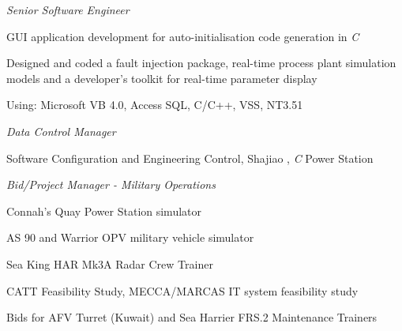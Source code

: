 \documentclass[10pt]{article}
\newenvironment{outerlist}[1][\enskip\textbullet]%
        {\begin{itemize}[#1]}{\end{itemize}%
         \vspace{-.6\baselineskip}}
\newenvironment{innerlist}[1][\enskip\textbullet]%
        {\begin{compactitem}[#1]}{\end{compactitem}}
\begin{document}
\begin{outerlist}

\item[] \textit{Senior Software Engineer}%
\begin{innerlist}
\item GUI application development for auto-initialisation code generation in \textit{C}
\item Designed and coded a fault injection package, real-time process plant simulation models and a developer's toolkit for real-time parameter display
\item Using: Microsoft VB 4.0, Access SQL, C/C++, VSS, NT3.51
\end{innerlist}

\item[] \textit{Data Control Manager}
\begin{innerlist}
\item Software Configuration and Engineering Control, Shajiao , \textit{C} Power Station
\end{innerlist}

\item[] \textit{Bid/Project Manager - Military Operations}%
\begin{innerlist}
\item Connah's Quay Power Station simulator
\item AS 90 and Warrior OPV military vehicle simulator
\item Sea King HAR Mk3A Radar Crew Trainer 
\item CATT Feasibility Study, MECCA/MARCAS IT system feasibility study
\item Bids for AFV Turret (Kuwait) and Sea Harrier FRS.2 Maintenance Trainers

%
\end{innerlist}

%
%


\end{outerlist}
\end{document}
